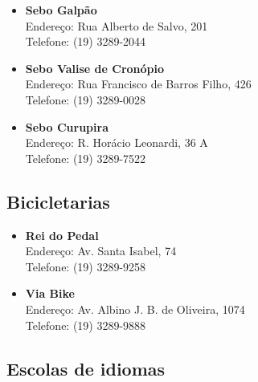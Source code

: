 \begin{itemize}
    \item   \textbf{Sebo Galpão}
        \\Endereço: Rua Alberto de Salvo, 201
        \\Telefone: (19) 3289-2044

    \item   \textbf{Sebo Valise de Cronópio}
        \\Endereço: Rua Francisco de Barros Filho, 426
        \\Telefone: (19) 3289-0028
        
    \item   \textbf{Sebo Curupira}
        \\Endereço: R. Horácio Leonardi, 36 A
        \\Telefone: (19) 3289-7522
\end{itemize}

\subsection{Bicicletarias}

\begin{itemize}
    \item   \textbf{Rei do Pedal}
        \\Endereço: Av. Santa Isabel, 74
        \\Telefone: (19) 3289-9258

    \item   \textbf{Via Bike}
        \\Endereço: Av. Albino J. B. de Oliveira, 1074
        \\Telefone: (19) 3289-9888
\end{itemize}

\subsection{Escolas de idiomas}

